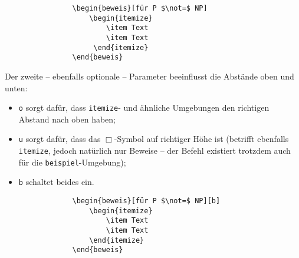 			\begin{verbatim}
				\begin{beweis}[für P $\not=$ NP]
				    \begin{itemize}
				        \item Text
				        \item Text
				     \end{itemize}
				\end{beweis}
			\end{verbatim}

			\vspace*{1em}


			Der zweite -- ebenfalls optionale -- Parameter beeinflusst die Abstände oben und unten:
			\begin{itemize}
				\item \texttt o sorgt dafür, dass \texttt{itemize}- und ähnliche Umgebungen den richtigen Abstand nach oben haben;
				\item \texttt u sorgt dafür, dass das $\Box$-Symbol auf richtiger Höhe ist (betrifft ebenfalls \texttt{itemize}, jedoch natürlich nur Beweise -- der Befehl existiert trotzdem auch für die \texttt{beispiel}-Umgebung);
				\item \texttt b schaltet beides ein.
			\end{itemize}


			\begin{verbatim}
				\begin{beweis}[für P $\not=$ NP][b]
				    \begin{itemize}
				        \item Text
				        \item Text
				    \end{itemize}
				\end{beweis}
			\end{verbatim}


